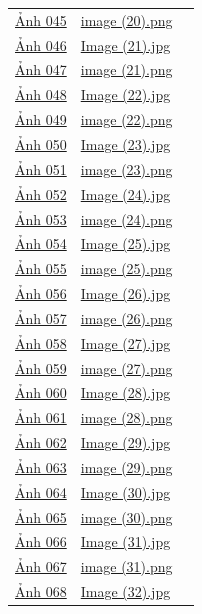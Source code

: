 \begin{longtable}{p{}p{}p{}}
\hyperref[src:045]{Ảnh 045} & \url{image (20).png} & \pageref{src:045}\\
\hyperref[src:046]{Ảnh 046} & \url{Image (21).jpg} & \pageref{src:046}\\
\hyperref[src:047]{Ảnh 047} & \url{image (21).png} & \pageref{src:047}\\
\hyperref[src:048]{Ảnh 048} & \url{Image (22).jpg} & \pageref{src:048}\\
\hyperref[src:049]{Ảnh 049} & \url{image (22).png} & \pageref{src:049}\\
\hyperref[src:050]{Ảnh 050} & \url{Image (23).jpg} & \pageref{src:050}\\
\hyperref[src:051]{Ảnh 051} & \url{image (23).png} & \pageref{src:051}\\
\hyperref[src:052]{Ảnh 052} & \url{Image (24).jpg} & \pageref{src:052}\\
\hyperref[src:053]{Ảnh 053} & \url{image (24).png} & \pageref{src:053}\\
\hyperref[src:054]{Ảnh 054} & \url{Image (25).jpg} & \pageref{src:054}\\
\hyperref[src:055]{Ảnh 055} & \url{image (25).png} & \pageref{src:055}\\
\hyperref[src:056]{Ảnh 056} & \url{Image (26).jpg} & \pageref{src:056}\\
\hyperref[src:057]{Ảnh 057} & \url{image (26).png} & \pageref{src:057}\\
\hyperref[src:058]{Ảnh 058} & \url{Image (27).jpg} & \pageref{src:058}\\
\hyperref[src:059]{Ảnh 059} & \url{image (27).png} & \pageref{src:059}\\
\hyperref[src:060]{Ảnh 060} & \url{Image (28).jpg} & \pageref{src:060}\\
\hyperref[src:061]{Ảnh 061} & \url{image (28).png} & \pageref{src:061}\\
\hyperref[src:062]{Ảnh 062} & \url{Image (29).jpg} & \pageref{src:062}\\
\hyperref[src:063]{Ảnh 063} & \url{image (29).png} & \pageref{src:063}\\
\hyperref[src:064]{Ảnh 064} & \url{Image (30).jpg} & \pageref{src:064}\\
\hyperref[src:065]{Ảnh 065} & \url{image (30).png} & \pageref{src:065}\\
\hyperref[src:066]{Ảnh 066} & \url{Image (31).jpg} & \pageref{src:066}\\
\hyperref[src:067]{Ảnh 067} & \url{image (31).png} & \pageref{src:067}\\
\hyperref[src:068]{Ảnh 068} & \url{Image (32).jpg} & \pageref{src:068}\\

\end{longtable}
